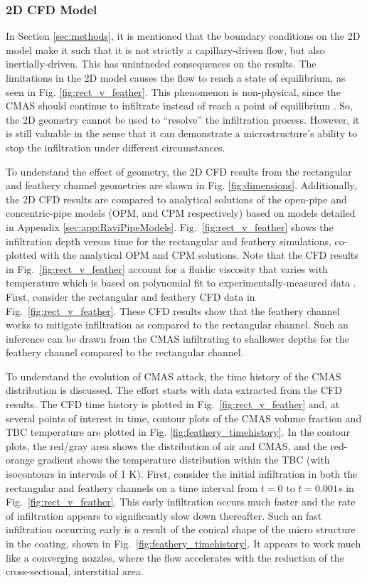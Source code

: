 \documentclass[%
 aip,
 amsmath,amssymb,
 reprint,%
floatfix]{revtex4-1}
\begin{document}
\subsubsection{2D CFD Model}
In Section \ref{sec:methods}, it is mentioned that the boundary conditions on the 2D model make it such that it is not strictly a capillary-driven flow, but also inertially-driven. This has unintneded consequences on the results. The limitations in the 2D model causes the flow to reach a state of equilibrium, as seen in Fig. \ref{fig:rect_v_feather}. This phenomenon is non-physical, since the CMAS should continue to infiltrate instead of reach a point of equilibrium \cite{Naraparaju2017}. So, the 2D geometry cannot be used to ``resolve'' the infiltration process. However, it is still valuable in the sense that it can demonstrate a microstructure's ability to stop the infiltration under different circumstances.

To understand the effect of geometry, the 2D CFD results from the rectangular and feathery channel geometries are shown in Fig. \ref{fig:dimensions}.
Additionally, the 2D CFD results are compared to analytical solutions of the open-pipe and concentric-pipe models (OPM, and CPM respectively) \cite{Naraparaju2019} based on models detailed in Appendix \ref{sec:app:RaviPipeModels}. 
Fig.~\ref{fig:rect_v_feather} shows the infiltration depth versus time for the rectangular and feathery simulations, co-plotted with the analytical OPM and CPM solutions. 
Note that the CFD results in Fig.~\ref{fig:rect_v_feather} account for a fluidic viscosity that varies with temperature which is based on polynomial fit to experimentally-measured data \cite{Naraparaju2017}.\\

First, consider the rectangular and feathery CFD data in Fig.~\ref{fig:rect_v_feather}.
These CFD results show that the feathery channel works to mitigate infiltration as compared to the rectangular channel. Such an inference can be drawn from the CMAS infiltrating to shallower depths for the feathery channel compared to the rectangular channel. 


To understand the evolution of CMAS attack, the time history of the CMAS distribution is discussed. 
The effort starts with data extracted from the CFD results. The CFD time history is plotted in Fig.~\ref{fig:rect_v_feather} and, at several points of interest in time, contour plots of the CMAS volume fraction and TBC temperature are plotted in Fig. \ref{fig:feathery_timehistory}. In the contour plots, the red/gray area shows the distribution of air and CMAS, and the red-orange gradient shows the temperature distribution within the TBC (with isocontours in intervals of 1 K). First, consider the initial infiltration in both the rectangular and feathery channels on a time interval from $t=0$ to $t=0.001 s$ in Fig.~\ref{fig:rect_v_feather}.
This early infiltration occurs much faster and the rate of infiltration appears to significantly slow down thereafter. 
Such an fast infiltration occurring early is a result of the conical shape of the micro structure in the coating, shown in Fig.~\ref{fig:feathery_timehistory}. It appears to work much like a converging nozzles, where the flow accelerates with the reduction of the cross-sectional, interstitial area. 
\end{document}

